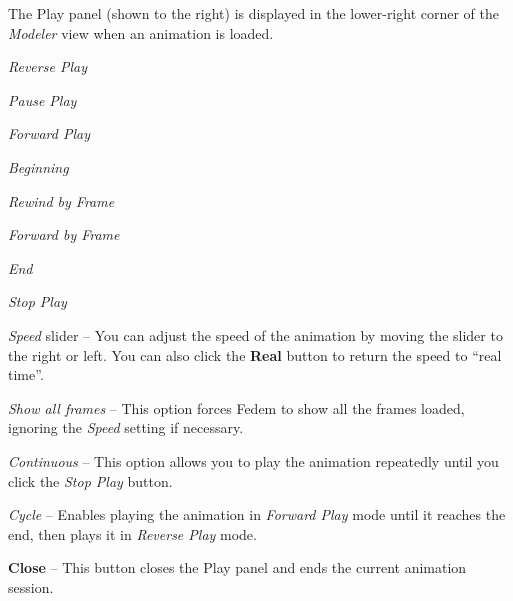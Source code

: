 The Play panel (shown to the right) is displayed in the lower-right corner
of the {\sl Modeler} view when an animation is loaded.

\begin{bulletlist}
\item{\sl Reverse Play}
\item{\sl Pause Play}
\item{\sl Forward Play}
\item{\sl Beginning}
\item{\sl Rewind by Frame}
\item{\sl Forward by Frame}
\item{\sl End}
\item{\sl Stop Play}
\end{bulletlist}

\begin{bulletlist}
   \setcounter{enumi}{8}
 \item{\sl Speed} slider --
   You can adjust the speed of the animation by moving the slider to the right
   or left. You can also click the \textbf{Real} button to return the speed to
   ``real time''.

 \item{\sl Show all frames} --
   This option forces Fedem to show all the frames loaded,
   ignoring the {\sl Speed} setting if necessary.
 \item{\sl Continuous} --
   This option allows you to play the animation repeatedly until you click the
   {\sl Stop Play} button.
 \item{\sl Cycle} --
   Enables playing the animation in {\sl Forward Play}  mode until it reaches
   the end, then plays it in {\sl Reverse Play} mode.
 \item\textbf{Close} --
   This button closes the Play panel and ends the current animation session.
\end{bulletlist}


\clearpage



